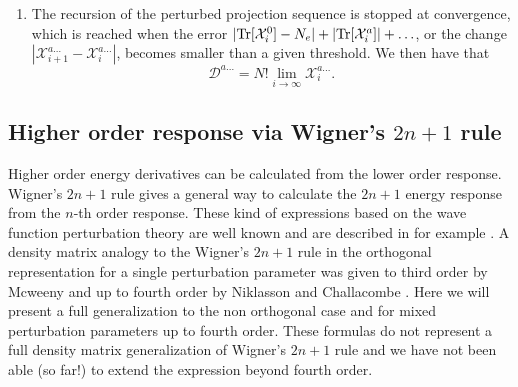 \documentclass[prl,aps,twocolumn,showpacs,twocolumngrid,superbib]{revtex4}
\def\Tr{{\rm Tr}}
\def\D{\mathcal{D}}
\def\X{\mathcal{X}}
\begin{document}
\begin{enumerate}
\item The recursion of the perturbed projection sequence is
  stopped at convergence, which is reached when the error
  $|\Tr[\X^0_{i}]-N_e| + |\Tr[\X^{a}_{i}]| + \ldots$, or 
  the change $|\X^{a\ldots}_{i+1}-\X^{a\ldots}_{i}|$,
  becomes smaller than a given threshold. We then have that 
\begin{equation}
  \D^{a...} = N!\lim_{i\rightarrow\infty} \X_i^{a...}.
\end{equation}

\end{enumerate}





\subsection{Higher order response via Wigner's $2n+1$ rule }

Higher order energy derivatives can be calculated from the lower
order response. Wigner's $2n+1$ rule gives a general way to calculate the $2n+1$
energy response from the $n$-th order response. These kind of expressions
based on the wave function perturbation theory are well known and are 
described in for example \cite{Dupuis_1991}.
A density matrix analogy to the Wigner's $2n+1$ rule in the orthogonal 
representation for a single perturbation parameter
was given to third order by Mcweeny \cite{RMcWeeny62}
and up to fourth order by Niklasson and Challacombe \cite{ANiklasson04}.
Here we will present a full generalization to the non orthogonal case 
and for mixed perturbation parameters up to fourth order. These formulas
do not represent a full density matrix generalization of Wigner's $2n+1$ 
rule and we have not been able (so far!) to extend the expression beyond 
fourth order. 
\end{document}
